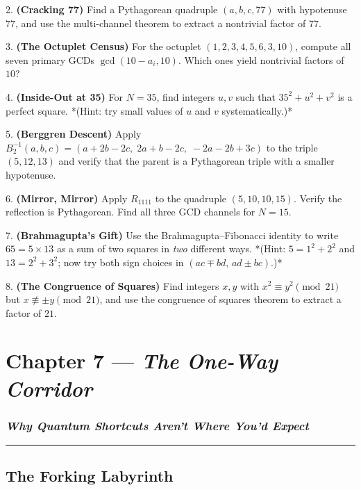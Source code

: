 \documentclass[12pt, letterpaper, openany]{book}
\theoremstyle{definition}
\theoremstyle{remark}
\begin{document}
2. \textbf{(Cracking 77)} Find a Pythagorean quadruple $(a, b, c, 77)$ with hypotenuse $77$, and use the multi-channel theorem to extract a nontrivial factor of $77$.

3. \textbf{(The Octuplet Census)} For the octuplet $(1, 2, 3, 4, 5, 6, 3, 10)$, compute all seven primary GCDs $\gcd(10 - a_i, 10)$. Which ones yield nontrivial factors of $10$?

4. \textbf{(Inside-Out at 35)} For $N = 35$, find integers $u, v$ such that $35^2 + u^2 + v^2$ is a perfect square. *(Hint: try small values of $u$ and $v$ systematically.)*

5. \textbf{(Berggren Descent)} Apply $B_2^{-1}(a, b, c) = (a + 2b - 2c,\; 2a + b - 2c,\; -2a - 2b + 3c)$ to the triple $(5, 12, 13)$ and verify that the parent is a Pythagorean triple with a smaller hypotenuse.

6. \textbf{(Mirror, Mirror)} Apply $R_{1111}$ to the quadruple $(5, 10, 10, 15)$. Verify the reflection is Pythagorean. Find all three GCD channels for $N = 15$.

7. \textbf{(Brahmagupta's Gift)} Use the Brahmagupta--Fibonacci identity to write $65 = 5 \times 13$ as a sum of two squares in \textit{two} different ways. *(Hint: $5 = 1^2 + 2^2$ and $13 = 2^2 + 3^2$; now try both sign choices in $(ac \mp bd, \, ad \pm bc)$.)*

8. \textbf{(The Congruence of Squares)} Find integers $x, y$ with $x^2 \equiv y^2 \pmod{21}$ but $x \not\equiv \pm y \pmod{21}$, and use the congruence of squares theorem to extract a factor of $21$.


\clearpage

\chapter{Chapter 7 --- \textit{The One-Way Corridor}}



\subsection*{\textit{Why Quantum Shortcuts Aren't Where You'd Expect}}



\bigskip\noindent\rule{\textwidth}{0.4pt}\bigskip



\section*{The Forking Labyrinth}
\end{document}
